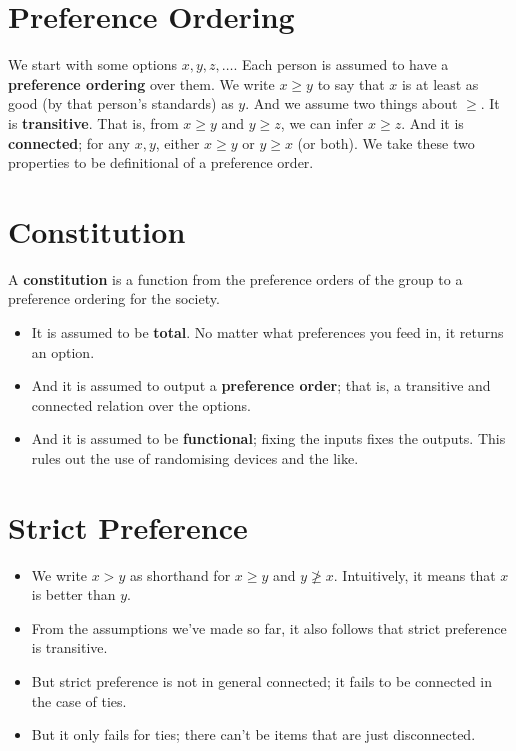 
\def\mytitle{Arrow's Theorem}
\def\myauthor{Brian Weatherson}
\def\mydate{March 6, 2018}
\usepackage{amssymb}



\section{Preference Ordering}
\label{preferenceordering}

We start with some options $x, y, z, \dots$. Each person is assumed to have a \textbf{preference ordering} over them. We write $x \geq y$ to say that $x$ is at least as good (by that person's standards) as $y$. And we assume two things about $\geq$. It is \textbf{transitive}. That is, from $x \geq y$ and $y \geq z$, we can infer $x \geq z$. And it is \textbf{connected}; for any $x, y$, either $x \geq y$ or $y \geq x$ (or both). We take these two properties to be definitional of a preference order.

\section{Constitution}
\label{constitution}

A \textbf{constitution} is a function from the preference orders of the group to a preference ordering for the society.

\begin{itemize}
\item{} It is assumed to be \textbf{total}. No matter what preferences you feed in, it returns an option.

\item{} And it is assumed to output a \textbf{preference order}; that is, a transitive and connected relation over the options.

\item{} And it is assumed to be \textbf{functional}; fixing the inputs fixes the outputs. This rules out the use of randomising devices and the like.

\end{itemize}
\section{Strict Preference}
\label{strictpreference}

\begin{itemize}
\item{} We write $x > y$ as shorthand for $x \geq y$ and $y \ngeq x$. Intuitively, it means that $x$ is better than $y$.

\item{} From the assumptions we've made so far, it also follows that strict preference is transitive.

\item{} But strict preference is not in general connected; it fails to be connected in the case of ties.

\item{} But it only fails for ties; there can't be items that are just disconnected.

\end{itemize}
